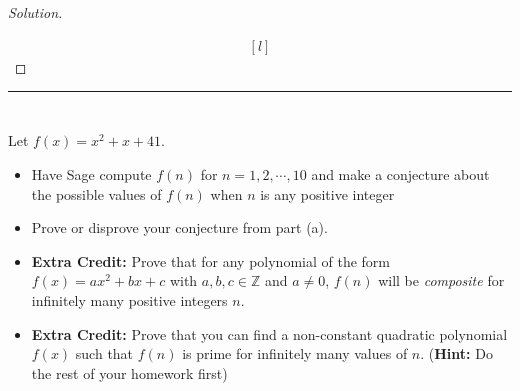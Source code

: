\documentclass[11pt]{article}
\newcommand{\Z}{\mathbb{Z}}
\newcommand{\bline}{\noindent\rule[0.5ex]{\linewidth}{1pt}}
\newenvironment{problem}[2][Problem]{\begin{trivlist}
\item[\hskip \labelsep {\bfseries #1}\hskip \labelsep {\bfseries #2.}]}{\end{trivlist}}
\newenvironment{solution}
  {\renewcommand\qedsymbol{$~$}\begin{proof}[Solution]$ $\par\nobreak\ignorespaces}
  {\end{proof}}
\begin{document}
\begin{solution}
\[\begin{matrix*}[l]
        \end{matrix*}
    \]
\end{solution}


\bline

\section{}
\begin{problem}{}
Let $f(x) = x^2+x+41$.
\begin{itemize}
    \item [(a)] Have Sage compute $f(n)$ for $n=1,2,\cdots, 10$ and make a conjecture about the possible values of $f(n)$ when $n$ is any positive integer
    \item [(b)] Prove or disprove your conjecture from part (a).
    \item [(c)] \textbf{Extra Credit:} Prove that for any polynomial of the form $f(x)=ax^2+bx+c$ with $a,b,c\in\Z$ and $a\neq 0$, $f(n)$ will be \textit{composite} for infinitely many positive integers $n$.
    \item [(d)] \textbf{Extra Credit:} Prove that you can find a non-constant quadratic polynomial $f(x)$ such that $f(n)$ is prime for infinitely many values of $n$. (\textbf{Hint:} Do the rest of your homework first)
\end{itemize}
\end{problem}
\end{document}
